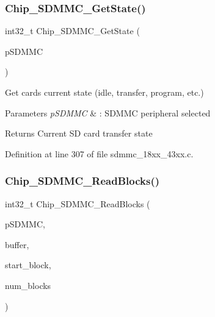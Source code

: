 \subsubsection{\texorpdfstring{Chip\+\_\+\+S\+D\+M\+M\+C\+\_\+\+Get\+State()}{Chip\_SDMMC\_GetState()}}
{\footnotesize\ttfamily int32\+\_\+t Chip\+\_\+\+S\+D\+M\+M\+C\+\_\+\+Get\+State (\begin{DoxyParamCaption}\item[{\hyperlink{struct_l_p_c___s_d_m_m_c___t}{L\+P\+C\+\_\+\+S\+D\+M\+M\+C\+\_\+T} $\ast$}]{p\+S\+D\+M\+MC }\end{DoxyParamCaption})}



Get card\textquotesingle{}s current state (idle, transfer, program, etc.) 


\begin{DoxyParams}{Parameters}
{\em p\+S\+D\+M\+MC} & \+: S\+D\+M\+MC peripheral selected \\
\hline
\end{DoxyParams}
\begin{DoxyReturn}{Returns}
Current SD card transfer state 
\end{DoxyReturn}


Definition at line 307 of file sdmmc\+\_\+18xx\+\_\+43xx.\+c.

\mbox{\label{group___s_d_m_m_c__18_x_x__43_x_x_ga9edeed44956f79b1078f566928c06d15}} 
\subsubsection{\texorpdfstring{Chip\+\_\+\+S\+D\+M\+M\+C\+\_\+\+Read\+Blocks()}{Chip\_SDMMC\_ReadBlocks()}}
{\footnotesize\ttfamily int32\+\_\+t Chip\+\_\+\+S\+D\+M\+M\+C\+\_\+\+Read\+Blocks (\begin{DoxyParamCaption}\item[{\hyperlink{struct_l_p_c___s_d_m_m_c___t}{L\+P\+C\+\_\+\+S\+D\+M\+M\+C\+\_\+T} $\ast$}]{p\+S\+D\+M\+MC,  }\item[{void $\ast$}]{buffer,  }\item[{int32\+\_\+t}]{start\+\_\+block,  }\item[{int32\+\_\+t}]{num\+\_\+blocks }\end{DoxyParamCaption})}



